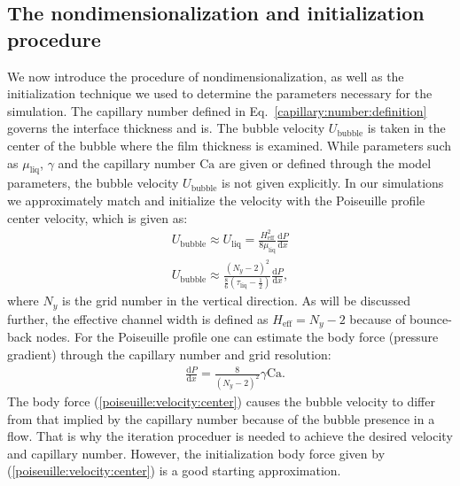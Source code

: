 \documentclass[preprint,12pt]{elsarticle}
\newcommand{\Ca}{\mathrm{Ca}}
\begin{document}
\subsection{The nondimensionalization and initialization procedure}
We now introduce the procedure of nondimensionalization, as well as
the initialization technique we used to determine the parameters necessary for
the simulation. The capillary number defined in Eq.~\ref{capillary:number:definition} governs the interface thickness and is.
The bubble velocity $U_{\mathrm{bubble}}$ is taken in the center of the bubble where the film
thickness is examined.
While parameters such as $\mu_{\mathrm{liq}}$, $\gamma$ and the capillary number $\Ca$ are given
or defined through the model parameters, the bubble velocity $U_{\mathrm{bubble}}$ is not given
explicitly.
In our simulations we approximately match and initialize the velocity with the
Poiseuille profile center velocity, which is given as:
\begin{equation}
\begin{aligned}
U_{\mathrm{bubble}} \approx U_{\mathrm{liq}}=\frac{H_{\mathrm{eff}}^2}{8
\mu_{\mathrm{liq}}}\frac{\mathrm{d}P}{\mathrm{d}x}\\
U_{\mathrm{bubble}}\approx
\frac{{(N_y-2)}^2}{\frac{8}{6}(\tau_{\mathrm{liq}}-\frac{1}{2})}\frac{\mathrm{d}P}{\mathrm{d}
x } ,
\end{aligned}
\end{equation}
where $N_y$ is the grid number in the vertical direction. As will be discussed further, the
effective channel width is defined as $H_{\mathrm{eff}}=N_y-2$ because of bounce-back nodes.
For the Poiseuille profile one can estimate the body force (pressure gradient) through the
capillary number and grid resolution:
\begin{equation}
\label{poiseuille:velocity:center}
\begin{aligned}
&\frac{\mathrm{d}P}{\mathrm{d}x}=\frac{8}{{(N_y-2)}^2}\gamma \Ca.
\end{aligned}
\end{equation}
The body force (\ref{poiseuille:velocity:center}) causes the bubble
velocity to differ from that implied by the capillary number because of the bubble presence in a flow. That is
why the iteration proceduer is needed to achieve the 
desired velocity and 
capillary number. 
However, the initialization body force given by (\ref{poiseuille:velocity:center}) is a good
starting approximation. 
\end{document}
